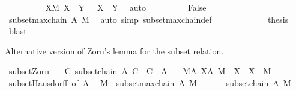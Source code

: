 \begin{isabellebody}
\ \ \ \ \ \ \ \ \isamarkupfalse%
\ {\isacartoucheopen}{\isasymforall}X{\isasymin}M{\isachardot}{\kern0pt}\ X\ {\isasymsubseteq}\ Y{\isacartoucheclose}\ \ {\isacartoucheopen}{\isasymnot}\ X\ {\isasymsubseteq}\ Y{\isacartoucheclose}\ \isamarkupfalse%
\ auto\isanewline
\ \ \ \ \ \ \isamarkupfalse%
\ \isamarkupfalse%
\ False\isanewline
\ \ \ \ \ \ \ \ \isamarkupfalse%
\ {\isacartoucheopen}subset{\isachardot}{\kern0pt}maxchain\ A\ M{\isacartoucheclose}\ \isamarkupfalse%
\ {\isacharparenleft}{\kern0pt}auto\ simp{\isacharcolon}{\kern0pt}\ subset{\isachardot}{\kern0pt}maxchain{\isacharunderscore}{\kern0pt}def{\isacharparenright}{\kern0pt}\isanewline
\ \ \ \ \isamarkupfalse%
\isanewline
\ \ \isamarkupfalse%
\isanewline
\ \ \isamarkupfalse%
\ \isamarkupfalse%
\ {\isacharquery}{\kern0pt}thesis\ \isamarkupfalse%
\ blast\isanewline
{}\isamarkupfalse%
%
\endisatagproof
{\isafoldproof}%
%
\isadelimproof
%
\endisadelimproof
%
\begin{isamarkuptext}%
Alternative version of Zorn's lemma for the subset relation.%
\end{isamarkuptext}\isamarkuptrue%
\isamarkupfalse%
\ subset{\isacharunderscore}{\kern0pt}Zorn{\isacharprime}{\kern0pt}{\isacharcolon}{\kern0pt}\isanewline
\ \ \ {\isachardoublequoteopen}{\isasymAnd}C{\isachardot}{\kern0pt}\ subset{\isachardot}{\kern0pt}chain\ A\ C\ {\isasymLongrightarrow}\ {\isasymUnion}C\ {\isasymin}\ A{\isachardoublequoteclose}\isanewline
\ \ \ {\isachardoublequoteopen}{\isasymexists}M{\isasymin}A{\isachardot}{\kern0pt}\ {\isasymforall}X{\isasymin}A{\isachardot}{\kern0pt}\ M\ {\isasymsubseteq}\ X\ {\isasymlongrightarrow}\ X\ {\isacharequal}{\kern0pt}\ M{\isachardoublequoteclose}\isanewline
%
\isadelimproof
%
\endisadelimproof
%
\isatagproof
{}\isamarkupfalse%
\ {\isacharminus}{\kern0pt}\isanewline
\ \ \isamarkupfalse%
\ subset{\isachardot}{\kern0pt}Hausdorff\ {\isacharbrackleft}{\kern0pt}of\ A{\isacharbrackright}{\kern0pt}\ \isamarkupfalse%
\ M\ \ {\isachardoublequoteopen}subset{\isachardot}{\kern0pt}maxchain\ A\ M{\isachardoublequoteclose}\ \isacommand{{\isachardot}{\kern0pt}{\isachardot}{\kern0pt}}\isamarkupfalse%
\isanewline
\ \ \isamarkupfalse%
\ \isamarkupfalse%
\ {\isachardoublequoteopen}subset{\isachardot}{\kern0pt}chain\ A\ M{\isachardoublequoteclose}\isanewline

\end{isabellebody}
